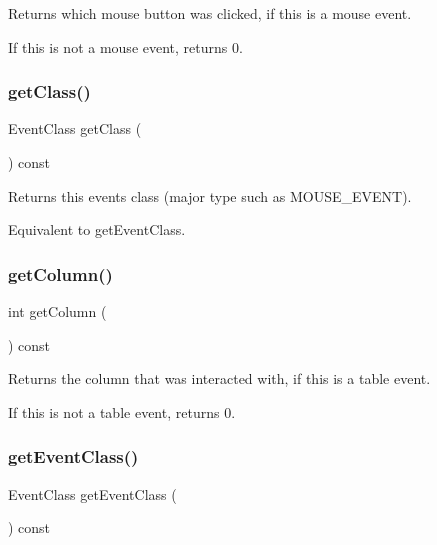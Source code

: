 Returns which mouse button was clicked, if this is a mouse event. 

If this is not a mouse event, returns 0. \mbox{\label{classGEvent_a389eadf538a5311effff6a08d0426b34}} 
\subsubsection{\texorpdfstring{get\+Class()}{getClass()}}
{\footnotesize\ttfamily Event\+Class get\+Class (\begin{DoxyParamCaption}{ }\end{DoxyParamCaption}) const\hspace{0.3cm}{\ttfamily [virtual]}}



Returns this event\textquotesingle{}s class (major type such as M\+O\+U\+S\+E\+\_\+\+E\+V\+E\+NT). 

Equivalent to get\+Event\+Class. \mbox{\label{classGEvent_a36cb86612277798a9adb168403386280}} 
\subsubsection{\texorpdfstring{get\+Column()}{getColumn()}}
{\footnotesize\ttfamily int get\+Column (\begin{DoxyParamCaption}{ }\end{DoxyParamCaption}) const\hspace{0.3cm}{\ttfamily [virtual]}}



Returns the column that was interacted with, if this is a table event. 

If this is not a table event, returns 0. \mbox{\label{classGEvent_a84e9319971c682404ea8f030cfee38f9}} 
\subsubsection{\texorpdfstring{get\+Event\+Class()}{getEventClass()}}
{\footnotesize\ttfamily Event\+Class get\+Event\+Class (\begin{DoxyParamCaption}{ }\end{DoxyParamCaption}) const\hspace{0.3cm}{\ttfamily [virtual]}}



